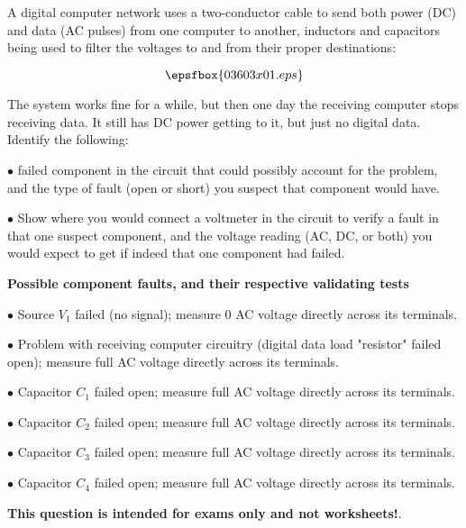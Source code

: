 

A digital computer network uses a two-conductor cable to send both power (DC) and data (AC pulses) from one computer to another, inductors and capacitors being used to filter the voltages to and from their proper destinations:

$$\epsfbox{03603x01.eps}$$

The system works fine for a while, but then one day the receiving computer stops receiving data.  It still has DC power getting to it, but just no digital data.  Identify the following:

\vskip 10pt

\medskip
\item{$\bullet$}  failed component in the circuit that could possibly account for the problem, and the type of fault (open or short) you suspect that component would have.
\vskip 40pt
\item{$\bullet$} Show where you would connect a voltmeter in the circuit to verify a fault in that one suspect component, and the voltage reading (AC, DC, or both) you would expect to get if indeed that one component had failed.
\medskip







\goodbreak
\noindent
{\bf Possible component faults, and their respective validating tests}

\medskip
\item{$\bullet$} Source $V_1$ failed (no signal); measure 0 AC voltage directly across its terminals.
\item{$\bullet$} Problem with receiving computer circuitry (digital data load "resistor" failed open); measure full AC voltage directly across its terminals.
\item{$\bullet$} Capacitor $C_1$ failed open; measure full AC voltage directly across its terminals.
\item{$\bullet$} Capacitor $C_2$ failed open; measure full AC voltage directly across its terminals.
\item{$\bullet$} Capacitor $C_3$ failed open; measure full AC voltage directly across its terminals.
\item{$\bullet$} Capacitor $C_4$ failed open; measure full AC voltage directly across its terminals.
\medskip







{\bf This question is intended for exams only and not worksheets!}.



